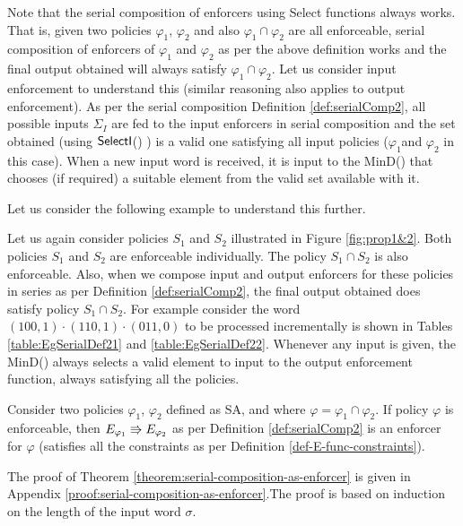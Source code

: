 Note that the serial composition of enforcers using Select functions always works. That is, given two policies $\varphi_1$, $\varphi_2$ and also $\varphi_1 \cap \varphi_2$ are all enforceable, serial composition of enforcers of $\varphi_1$ and $\varphi_2$ as per the above definition works and the final output obtained will always satisfy $\varphi_1 \cap \varphi_2$. Let us consider input enforcement to understand this (similar reasoning also applies to output enforcement).
As per the serial composition Definition \ref{def:serialComp2}, all possible inputs $\Sigma_I$ are fed to the input enforcers in serial composition\blue{,} and the set obtained (using $\mathsf{SelectI}$() ) is a valid one satisfying all input policies ($\varphi_1$and $\varphi_2$ in this case). When a new input word is received, it is input to the MinD() that chooses (if required) a suitable element from the valid set available with it. 

Let us consider the following example to understand this further.

\begin{example}
	Let us again consider policies $S_1$ and $S_2$ illustrated in Figure \ref{fig:prop1&2}. 
	Both policies $S_1$ and $S_2$ are enforceable individually. The policy $S_1 \cap S_2$ is also enforceable. 
	Also, when we compose input and output enforcers for these policies in series as per Definition \ref{def:serialComp2}, the final output obtained does satisfy policy $S_1 \cap S_2$. For example consider the word $(100,1) \cdot (110,1) \cdot (011,0)$ to be processed incrementally is shown in Tables \ref{table:EgSerialDef21} and \ref{table:EgSerialDef22}. Whenever any input is given, the MinD() always selects a valid element to input to the output enforcement function, always satisfying all the policies.
\end{example}

\begin{theorem}
	\label{theorem:serial-composition-as-enforcer}
	
	{Consider two policies $\varphi_1$, $\varphi_2$ defined as SA, and where $\varphi = \varphi_1 \cap \varphi_2$.}
	{
		If policy $\varphi$ is enforceable, then $E_{{\varphi_1}} \Rrightarrow E_{{\varphi_2}}$ as per Definition \ref{def:serialComp2} is an enforcer for $\varphi$ (satisfies all the constraints as per Definition \ref{def-E-func-constraints}). 
	}
\end{theorem}
The proof of Theorem \ref{theorem:serial-composition-as-enforcer} is given in Appendix \ref{proof:serial-composition-as-enforcer}.The proof is based on induction on the length of the input word $\sigma$.

